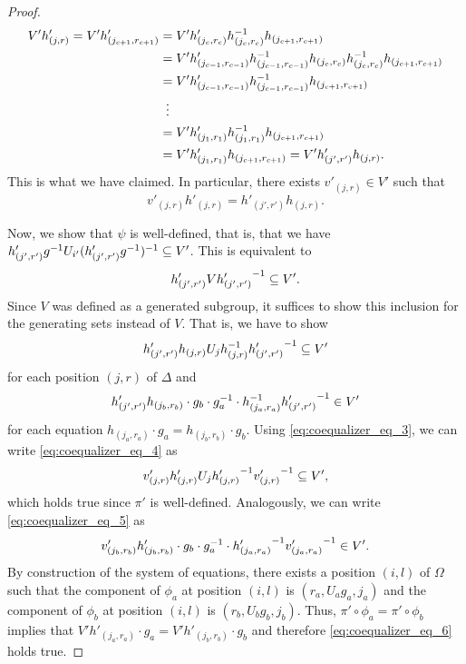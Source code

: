 \begin{proof}
\begin{align*}
V'h'_{(j,r)} = V'h'_{(j_{c+1},r_{c+1})} &= V' h'_{(j_c,r_c)} h_{(j_c,r_c)}\inv h_{(j_{c+1},r_{c+1})}\\
                                        &= V' h'_{(j_{c-1},r_{c-1})} h_{(j_{c-1},r_{c-1})}\inv h_{(j_c,r_c)} h_{(j_c,r_c)}\inv h_{(j_{c+1},r_{c+1})}\\
                                        &= V' h'_{(j_{c-1},r_{c-1})} h_{(j_{c-1},r_{c-1})}\inv h_{(j_{c+1},r_{c+1})}\\
                                        &\vdotswithin{=}\\
                                        &= V' h'_{(j_1,r_1)} h_{(j_1,r_1)}\inv h_{(j_{c+1},r_{c+1})}\\
                                        &= V' h'_{(j_1,r_1)} h_{(j_{c+1},r_{c+1})} = V' h'_{(j',r')} h_{(j,r)}.
\end{align*}
This is what we have claimed. In particular, there exists $v'_{(j,r)} \in V'$ such that
\begin{equation}
v'_{(j,r)} h'_{(j,r)} = h'_{(j',r')} h_{(j,r)}.\label{eq:coequalizer_eq_3}
\end{equation}

Now, we show that $\psi$ is well-defined, that is, that we have $h'_{(j',r')} g^{-1} U_{i'} (h'_{(j',r')} g^{-1})^{-1} \subseteq V'$. This is equivalent to \[h'_{(j',r')} V {h'_{(j',r')}}^{-1} \subseteq V'.\] Since $V$ was defined as a generated subgroup, it suffices to show this inclusion for the generating sets instead of $V$. That is, we have to show
\begin{equation}
h'_{(j',r')} h_{(j,r)} U_j h_{(j,r)}^{-1} {h'_{(j',r')}}^{-1} \subseteq V'\label{eq:coequalizer_eq_4}
\end{equation}
for each position $(j,r)$ of $\Delta$ and
\begin{equation}
{h'_{(j',r')}} h_{(j_b,r_b)} \cdot g_b \cdot g_a^{-1} \cdot h_{(j_a,r_a)}^{-1} {h'_{(j',r')}}^{-1} \in V'\label{eq:coequalizer_eq_5}
\end{equation}
for each equation $h_{(j_a,r_a)} \cdot g_a = h_{(j_b,r_b)} \cdot g_b$. Using \eqref{eq:coequalizer_eq_3}, we can write \eqref{eq:coequalizer_eq_4} as \[v'_{(j,r)} h'_{(j,r)} U_j {h'_{(j,r)}}^{-1} {v'_{(j,r)}}^{-1} \subseteq V',\] which holds true since $\pi'$ is well-defined. Analogously, we can write \eqref{eq:coequalizer_eq_5} as
\begin{equation}
v'_{(j_b,r_b)} h'_{(j_b,r_b)} \cdot g_b \cdot g_a^{-1} \cdot {h'_{(j_a,r_a)}}^{-1} {v'_{(j_a,r_a)}}^{-1} \in V'.\label{eq:coequalizer_eq_6}
\end{equation}
By construction of the system of equations, there exists a position $(i,l)$ of $\Omega$ such that the component of $\phi_a$ at position $(i,l)$ is $(r_a,U_ag_a,j_a)$ and the component of $\phi_b$ at position $(i,l)$ is $(r_b,U_bg_b,j_b)$. Thus, $\pi' \circ \phi_a = \pi' \circ \phi_b$ implies that $V' h'_{(j_a,r_a)} \cdot g_a = V' h'_{(j_b,r_b)} \cdot g_b$ and therefore \eqref{eq:coequalizer_eq_6} holds true.


\end{proof}
